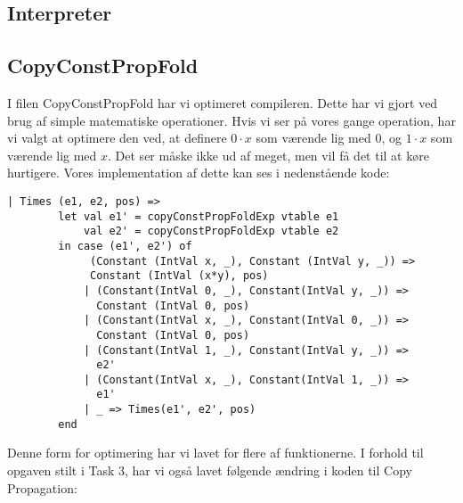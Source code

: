 \documentclass[a4paper]{article}
\begin{document}
\subsection{Interpreter}
\subsection{CopyConstPropFold}
I filen CopyConstPropFold har vi optimeret compileren. Dette har vi gjort ved brug af simple matematiske operationer. Hvis vi ser på vores gange operation, har vi valgt at optimere den ved, at definere $0 \cdot x$ som værende lig med $0$, og $1 \cdot x$ som værende lig med $x$. Det ser måske ikke ud af meget, men vil få det til at køre hurtigere. Vores implementation af dette kan ses i nedenstående kode:
\begin{lstlisting}
| Times (e1, e2, pos) =>
        let val e1' = copyConstPropFoldExp vtable e1
            val e2' = copyConstPropFoldExp vtable e2
        in case (e1', e2') of
             (Constant (IntVal x, _), Constant (IntVal y, _)) =>
             Constant (IntVal (x*y), pos)
            | (Constant(IntVal 0, _), Constant(IntVal y, _)) =>
              Constant (IntVal 0, pos)
            | (Constant(IntVal x, _), Constant(IntVal 0, _)) =>
              Constant (IntVal 0, pos)
            | (Constant(IntVal 1, _), Constant(IntVal y, _)) =>
              e2'
            | (Constant(IntVal x, _), Constant(IntVal 1, _)) =>
              e1'
            | _ => Times(e1', e2', pos)
        end
\end{lstlisting}
Denne form for optimering har vi lavet for flere af funktionerne. I forhold til opgaven stilt i Task 3, har vi også lavet følgende ændring i koden til Copy Propagation:
\end{document}
